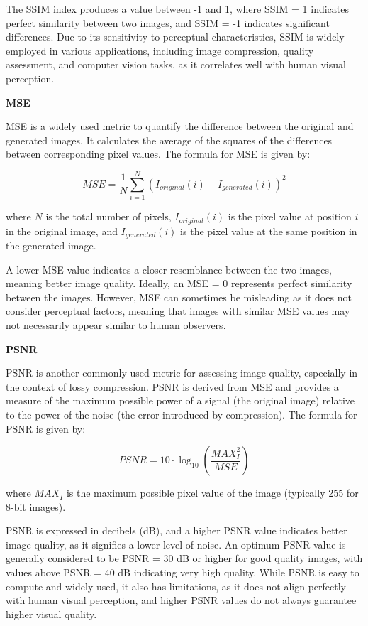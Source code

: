 \documentclass[12pt,DIV14,BCOR12mm,a4paper,footinclude=false,headinclude,parskip=half-,twoside,openright,cleardoublepage=empty,toc=index,bibliography=totoc,listof=totoc]{scrreprt}
\numberwithin{equation}{chapter}
\begin{document}
The SSIM index produces a value between -1 and 1, where SSIM = 1 indicates perfect similarity between two images, and SSIM = -1 indicates significant differences. Due to its sensitivity to perceptual characteristics, SSIM is widely employed in various applications, including image compression, quality assessment, and computer vision tasks, as it correlates well with human visual perception.

\textbf{MSE}

MSE is a widely used metric to quantify the difference between the original and generated images. It calculates the average of the squares of the differences between corresponding pixel values. The formula for MSE is given by:

\begin{equation}
MSE = \frac{1}{N} \sum_{i=1}^{N} (I_{original}(i) - I_{generated}(i))^2
\end{equation}

where \( N \) is the total number of pixels, \( I_{original}(i) \) is the pixel value at position \( i \) in the original image, and \( I_{generated}(i) \) is the pixel value at the same position in the generated image.

A lower MSE value indicates a closer resemblance between the two images, meaning better image quality. Ideally, an MSE = 0 represents perfect similarity between the images. However, MSE can sometimes be misleading as it does not consider perceptual factors, meaning that images with similar MSE values may not necessarily appear similar to human observers.

\textbf{PSNR}

PSNR is another commonly used metric for assessing image quality, especially in the context of lossy compression. PSNR is derived from MSE and provides a measure of the maximum possible power of a signal (the original image) relative to the power of the noise (the error introduced by compression). The formula for PSNR is given by:

\begin{equation}
PSNR = 10 \cdot \log_{10}\left(\frac{MAX_I^2}{MSE}\right)
\end{equation}

where \( MAX_I \) is the maximum possible pixel value of the image (typically 255 for 8-bit images).

PSNR is expressed in decibels (dB), and a higher PSNR value indicates better image quality, as it signifies a lower level of noise. An optimum PSNR value is generally considered to be PSNR = 30 dB or higher for good quality images, with values above PSNR = 40 dB indicating very high quality. While PSNR is easy to compute and widely used, it also has limitations, as it does not align perfectly with human visual perception, and higher PSNR values do not always guarantee higher visual quality.
\end{document}
